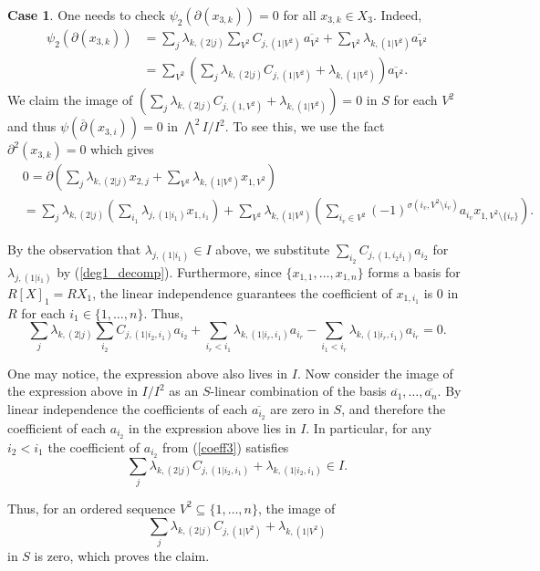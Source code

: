 \documentclass{amsart}
\theoremstyle{definition}
\newtheorem{case}[theorem]{Case}
\theoremstyle{remark}
\begin{document}
\begin{case}
One needs to check $\psi_2(\partial(x_{3,k})) = 0$ for all $x_{3,k}\in X_{3}$.
Indeed,
\begin{align*}
    \psi_2 \left( \partial(x_{3,k})\right) &= \sum_{j}\lambda_{k,(2|j)}\sum_{V^2}C_{j,(1|V^2)} \, \overline{a_{V^2}} + \sum_{V^2}\lambda_{k
    , (1|V^2)}\overline{a_{V^2}}\\
    &= \sum_{V^2}\left(\sum_{j}\lambda_{k,(2|j)}C_{j,(1|V^2)} +\lambda_{k, (1|V^2)} \right) \overline{a_{V^2}}.
\end{align*}
We claim the image of $\left(\sum_{j}\lambda_{k,(2|j)}C_{j,(1,V^2)} +\lambda_{k, (1|V^2)} \right)  = 0$ in $S$ for each $V^2$ and thus $\psi(\overline{\partial}(x_{3,i}))=0$ in $\bigwedge^{2}I/I^2$. 
To see this, we use the fact  $\partial^2(x_{3,k})=0$ which gives
\begin{align*}
    &0= \partial \left(\sum_{j} \lambda_{k,(2|j)}x_{2,j} + \sum_{V^2}\lambda_{k, (1|V^2)}x_{1,V^2} \right) \\ 
    &=\sum_{j}\lambda_{k,(2|j)}\left( \sum_{i_1} \lambda_{j,(1|i_1)}x_{1,i_1} \right) + \sum_{V^2}\lambda_{k, (1|V^2)} \left( \sum_{i_v\in V^2}(-1)^{\sigma(i_v,V^2\setminus i_v)} a_{i_v}x_{1,V^2\setminus\{i_v\}}\right).
\end{align*}

By the observation that $\lambda_{j,(1|i_1)} \in I$ above, we substitute   $ \sum_{i_2} C_{j,(1,i_2i_1)}a_{i_2}$ for $\lambda_{j,(1|i_1)}$ by (\ref{deg1_decomp}). Furthermore, since $\{ x_{1,1}, \ldots, x_{1,n}\}$ forms a basis for $R[ X ]_1=RX_1$, the linear independence guarantees the coefficient of $x_{1,i_1}$ is $0$ in $R$ for each $i_1 \in \{1, \ldots, n\}$. Thus,
\begin{equation}
\label{coeff3}
    \sum_{j}\lambda_{k,(2|j)}\sum_{i_2}C_{j,(1|i_2,i_1)}a_{i_2} + \sum_{i_{r}< i_1}\lambda_{k, (1|i_r,i_1)}a_{i_r}- \sum_{i_1<i_r}\lambda_{k, (1|i_r,i_1)}a_{i_r} = 0.
\end{equation}

One may notice, the expression above also lives in $I$. Now consider the image of the expression above in $I/I^2$ as an $S$-linear combination of the basis $\overline{a_1}, \ldots , \overline{a_n}$. By linear independence the coefficients of each $\overline{a_{i_2}}$ are zero in $S$, and therefore the coefficient of each $a_{i_2}$ in the expression above lies in $I$. In particular, for any $i_2 < i_1$ the coefficient of $a_{i_{2}}$ from (\ref{coeff3}) satisfies 
$$
\sum_{j}\lambda_{k,(2|j)}C_{j,(1|i_2,i_1)} + \lambda_{k, (1|i_2,i_1)} \in I.
$$ 

Thus, for an ordered sequence $V^2 \subseteq \{1, \ldots, n\}$, the image of
\begin{equation}
\label{deg2}
\sum_{j}\lambda_{k,(2|j)}C_{j,(1|V^2)} +\lambda_{k, (1|V^2)}
\end{equation}
in $S$ is zero, which proves the claim.
\end{case}
\end{document}
